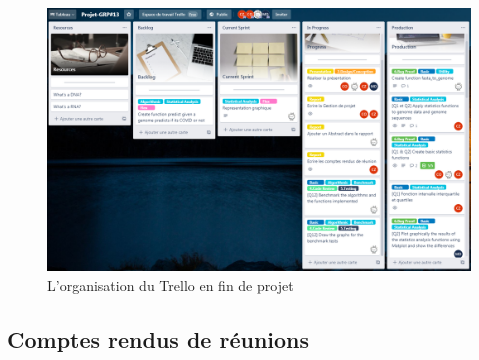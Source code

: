 \documentclass[12pt]{article}
\begin{document}
        \begin{figure}[!h]
            \centering
            \includegraphics[scale = 0.45]{Images/Gestion de Projet/Trello/trello_fin.PNG}
            \caption{L'organisation du Trello en fin de projet}
            \label{fig:Trellofin}
        \end{figure}

\newpage

\subsection*{Comptes rendus de réunions}
    
    \newpage
    
    \newpage
    
    \newpage
    
    \newpage
    
    \newpage
    
    \newpage
    
    \newpage
    
    \newpage
    
    \newpage
    
    \newpage
    
    \newpage
    

\newpage

\listoffigures
\listoftables

\newpage



\end{document}
